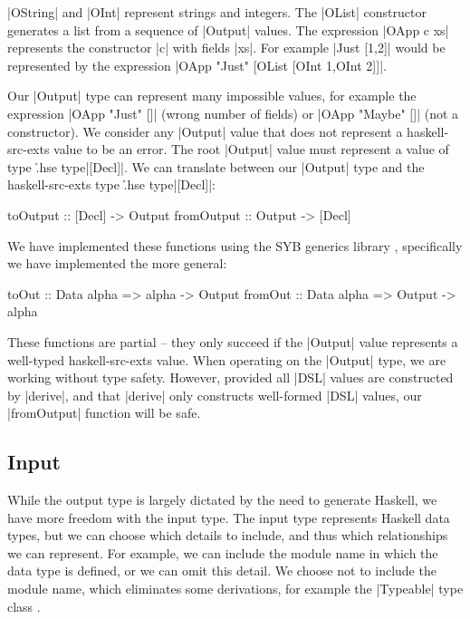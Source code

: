 \documentclass[preprint,draft]{sigplanconf}
\begin{document}
\noindent|OString| and |OInt| represent strings and integers. The |OList| constructor generates a list from a sequence of |Output| values. The expression |OApp c xs| represents the constructor |c| with fields |xs|. For example |Just [1,2]| would be represented by the expression |OApp "Just" [OList [OInt 1,OInt 2]]|.

Our |Output| type can represent many impossible values, for example the expression |OApp "Just" []| (wrong number of fields) or |OApp "Maybe" []| (not a constructor). We consider any |Output| value that does not represent a haskell-src-exts value to be an error. The root |Output| value must represent a value of type \h{.hse type}|[Decl]|. We can translate between our |Output| type and the haskell-src-exts type \h{.hse type}|[Decl]|:

\begin{code}
toOutput    :: [Decl] -> Output
fromOutput  :: Output -> [Decl]
\end{code}

We have implemented these functions using the SYB generics library \cite{lammel:syb2}, specifically we have implemented the more general:

\begin{code}
toOut    :: Data alpha => alpha -> Output
fromOut  :: Data alpha => Output -> alpha
\end{code}

These functions are partial -- they only succeed if the |Output| value represents a well-typed haskell-src-exts value. When operating on the |Output| type, we are working without type safety. However, provided all |DSL| values are constructed by |derive|, and that |derive| only constructs well-formed |DSL| values, our |fromOutput| function will be safe.

\subsection{Input}

While the output type is largely dictated by the need to generate Haskell, we have more freedom with the input type. The input type represents Haskell data types, but we can choose which details to include, and thus which relationships we can represent. For example, we can include the module name in which the data type is defined, or we can omit this detail. We choose not to include the module name, which eliminates some derivations, for example the |Typeable| type class \cite{lammel:syb}.
\end{document}
